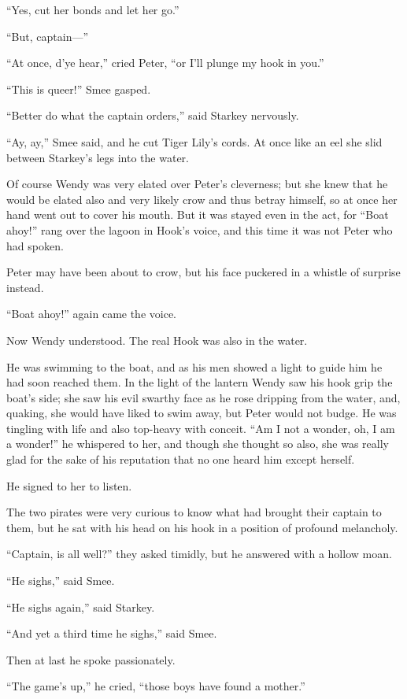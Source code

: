 ``Yes, cut her bonds and let her go.''

``But, captain—''

``At once, d'ye hear,'' cried Peter, ``or I'll plunge my hook in you.''

``This is queer!'' Smee gasped.

``Better do what the captain orders,'' said Starkey nervously.

``Ay, ay,'' Smee said, and he cut Tiger Lily's cords. At once like an eel
she slid between Starkey's legs into the water.

Of course Wendy was very elated over Peter's cleverness; but she knew
that he would be elated also and very likely crow and thus betray
himself, so at once her hand went out to cover his mouth. But it was
stayed even in the act, for ``Boat ahoy!'' rang over the lagoon in Hook's
voice, and this time it was not Peter who had spoken.

Peter may have been about to crow, but his face puckered in a whistle
of surprise instead.

``Boat ahoy!'' again came the voice.

Now Wendy understood. The real Hook was also in the water.

He was swimming to the boat, and as his men showed a light to guide him
he had soon reached them. In the light of the lantern Wendy saw his
hook grip the boat's side; she saw his evil swarthy face as he rose
dripping from the water, and, quaking, she would have liked to swim
away, but Peter would not budge. He was tingling with life and also
top-heavy with conceit. ``Am I not a wonder, oh, I am a wonder!'' he
whispered to her, and though she thought so also, she was really glad
for the sake of his reputation that no one heard him except herself.

He signed to her to listen.

The two pirates were very curious to know what had brought their
captain to them, but he sat with his head on his hook in a position of
profound melancholy.

``Captain, is all well?'' they asked timidly, but he answered with a
hollow moan.

``He sighs,'' said Smee.

``He sighs again,'' said Starkey.

``And yet a third time he sighs,'' said Smee.

Then at last he spoke passionately.

``The game's up,'' he cried, ``those boys have found a mother.''

